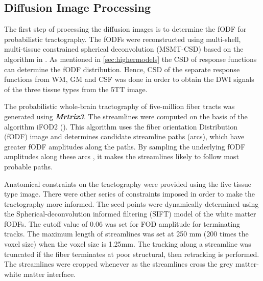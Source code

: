 \documentclass[msthesis.tex]{subfiles}
\begin{document}
\subsection{Diffusion Image Processing}

The first step of processing the diffusion images is to determine the fODF for probabilistic tractography. The fODFs were reconstructed using multi-shell, multi-tissue constrained spherical deconvolution (MSMT-CSD) based on the algorithm in \cite{jeurissen2014multi}. As mentioned in  \autoref{sec:highermodels} the CSD of response functions can determine the fODF distribution. Hence, CSD of the separate response functions from WM, GM and CSF was done in order to obtain the DWI signals of the three tissue types from the 5TT image.

The probabilistic whole-brain tractography of five-million fiber tracts was generated using \textbf{\textit{Mrtrix3}}. The streamlines were computed on the basis of the algorithm iFOD2 (\cite{tournier2010improved}). This algorithm uses the fiber orientation Distribution (fODF) image and determines candidate streamline paths (arcs), which have greater fODF amplitudes along the paths. By sampling the underlying fODF amplitudes along these arcs , it makes the streamlines likely to follow most probable paths.

Anatomical constraints on the tractography were provided using the five tissue type image. There were other series of constraints imposed in order to make the  tractography more informed. The seed points were dynamically determined using the Spherical-deconvolution informed filtering (SIFT) model \cite{smith2013sift} of the white matter fODFs. The cutoff value of 0.06 was set for FOD amplitude for terminating tracks. The maximum length of streamlines was set at 250 mm (200 times the voxel size) when the voxel size is 1.25mm. The tracking along a streamline was truncated if the fiber terminates at poor structural, then  retracking is performed. The streamlines were cropped whenever as the streamlines cross the grey matter-white matter interface. 
\end{document}
